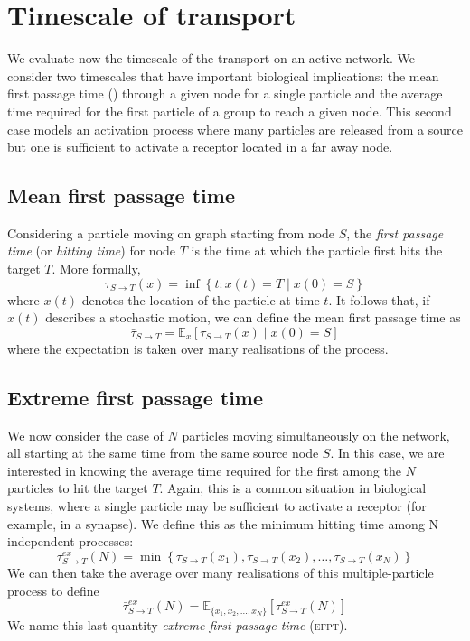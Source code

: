 \section{Timescale of transport}

We evaluate now the timescale of the transport on an active network. We consider two timescales that have important biological implications: the mean first passage time () through a given node for a single particle and the average time required for the first particle of a group to reach a given node. This second case models an activation process where many particles are released from a source but one is sufficient to activate a receptor located in a far away node.

\subsection{Mean first passage time}

Considering a particle moving on graph starting from node $S$, the \emph{first passage time} (or \emph{hitting time}) for node $T$ is the time at which the particle first hits the target $T$. More formally,
\begin{equation}
  \tau_{S \to T}(x) = \inf \left\{ t: x(t) = T \mid x(0) = S \right\}
\end{equation}
where $x(t)$ denotes the location of the particle at time $t$.
It follows that, if $x(t)$ describes a stochastic motion, we can define the mean first passage time as
\begin{equation}
  \bar{\tau}_{S \to T} = \mathbb{E}_x\left[\tau_{S \to T}(x) \mid x(0) = S\right]
\end{equation}
where the expectation is taken over many realisations of the process.


\subsection{Extreme first passage time}

We now consider the case of $N$ particles moving simultaneously on the network, all starting at the same time from the same source node $S$. In this case, we are interested in knowing the average time required for the first among the $N$ particles to hit the target $T$. Again, this is a common situation in biological systems, where a single particle may be sufficient to activate a receptor (for example, in a synapse). We define this as the minimum hitting time among N independent processes:
\begin{equation}
  \tau^{ex}_{S \to T}(N) = \min \left\{ \tau_{S \to T}(x_1), \tau_{S \to T}(x_2), \dots, \tau_{S \to T}(x_N) \right\}
\end{equation}
We can then take the average over many realisations of this multiple-particle process to define
\begin{equation}
  \bar{\tau}^{ex}_{S \to T}(N) = \mathbb{E}_{\{x_1, x_2, \dots, x_N\}} \left[ \tau^{ex}_{S \to T}(N) \right]
\end{equation}
We name this last quantity \textit{extreme first passage time} (\textsc{efpt}).

